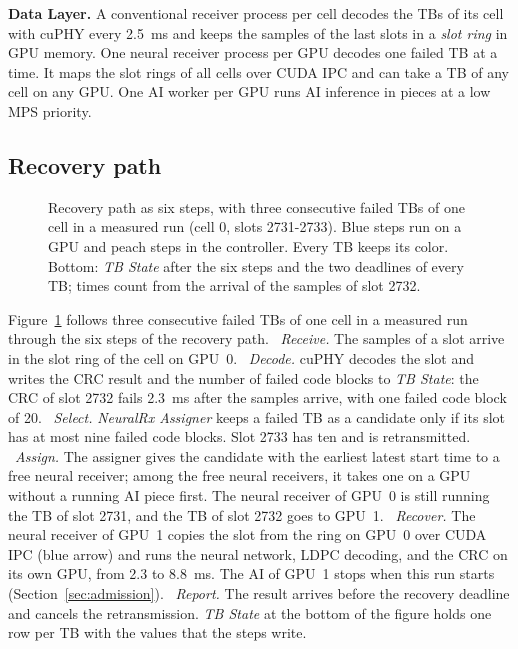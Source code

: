 \documentclass[acmsmall,screen,review,anonymous]{acmart}
\begin{document}
\noindent\textbf{Data Layer.} A conventional receiver process per cell decodes the TBs of its cell with
cuPHY every 2.5~ms and keeps the samples of the last slots in a \textit{slot ring} in GPU memory. One
neural receiver process per GPU decodes one failed TB at a time. It maps the slot rings of all cells over
CUDA IPC and can take a TB of any cell on any GPU. One AI worker per GPU runs AI inference in pieces at a
low MPS priority.

\subsection{Recovery path}
\label{sec:recovery}

\begin{figure}[t]
\centering
\resizebox{\linewidth}{!}{}
\caption{Recovery path as six steps, with three consecutive failed TBs of one cell in a measured run (cell 0,
slots 2731-2733). Blue steps run on a GPU and peach steps in the controller. Every TB keeps its color.
Bottom: \textit{TB State} after the six steps and the two deadlines of every TB; times count from the
arrival of the samples of slot 2732.}
\label{fig:recovery}
\end{figure}

Figure~\ref{fig:recovery} follows three consecutive failed TBs of one cell in a measured run through the six
steps of the recovery path. ~\textit{Receive.} The samples of a slot arrive in the slot ring of the
cell on GPU~0. ~\textit{Decode.} cuPHY decodes the slot and writes the CRC result and the number of
failed code blocks to \textit{TB State}: the CRC of slot 2732 fails 2.3~ms after the samples arrive, with
one failed code block of 20. ~\textit{Select.} \textit{NeuralRx Assigner} keeps a failed TB as a
candidate only if its slot has at most nine failed code blocks. Slot 2733 has ten and is retransmitted.
~\textit{Assign.} The assigner gives the candidate with the earliest latest start time to a free
neural receiver; among the free neural receivers, it takes one on a GPU without a running AI piece first.
The neural receiver of GPU~0 is still running the TB of slot 2731, and the TB of slot 2732 goes to GPU~1.
~\textit{Recover.} The neural receiver of GPU~1 copies the slot from the ring on GPU~0 over CUDA
IPC (blue arrow) and runs the neural network, LDPC decoding, and the CRC on its own GPU, from 2.3 to 8.8~ms.
The AI of GPU~1 stops when this run starts (Section~\ref{sec:admission}). ~\textit{Report.} The
result arrives before the recovery deadline and cancels the retransmission. \textit{TB State} at the
bottom of the figure holds one row per TB with the values that the steps write.
\end{document}
